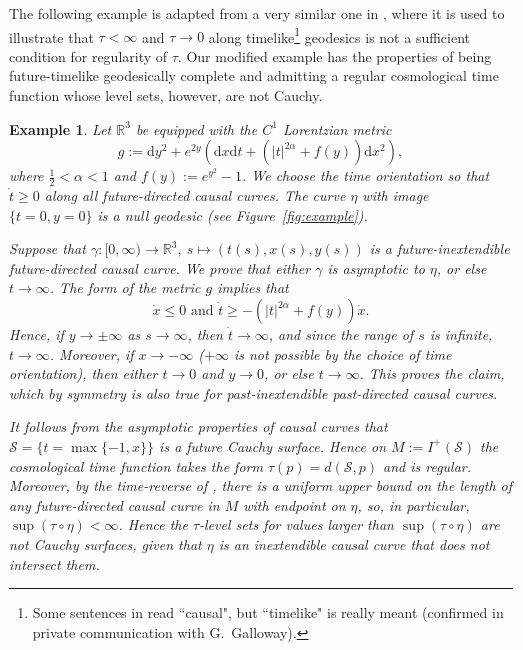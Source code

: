 \documentclass[a4paper,11pt]{amsart}
\newtheorem{example}[theorem]{{Example}}%
\newcommand{\R}{\mathbb{R}}
\newcommand{\CS}{\mathcal{S}}
\newcommand{\df}{\mathrm{d}}
\begin{document}
The following example is adapted from a very similar one in \cite[Sec.~4.3]{AGH98}, where it is used to illustrate that $\tau < \infty$ and $\tau \to 0$ along timelike\footnote{Some sentences in \cite{AGH98} read ``causal", but ``timelike" is really meant (confirmed in private communication with G.~Galloway).} geodesics is not a sufficient condition for regularity of $\tau$. Our modified example has the properties of being future-timelike geodesically complete and admitting a regular cosmological time function whose level sets, however, are not Cauchy.

\begin{example} \label{counterexCauchy}
 Let $\R^3$ be equipped with the $C^1$ Lorentzian metric
 \begin{equation*}
  g := \df y^2 + e^{2y} \left( \df x \df t + (\vert t \vert^{2\alpha} + f(y)) \df x^2 \right),
 \end{equation*}
 where $\frac{1}{2} < \alpha < 1$ and $f(y) := e^{y^2} - 1$. We choose the time orientation so that $\dot t \geq 0$ along all future-directed causal curves. The curve $\eta$ with image $\{t=0,y=0\}$ is a null geodesic (see Figure~\ref{fig:example}).
 
 Suppose that $\gamma \colon [0,\infty) \to \R^3,\ s \mapsto (t(s),x(s),y(s))$ is a future-inextendible future-directed causal curve. We prove that either $\gamma$ is asymptotic to $\eta$, or else $t \to \infty$. The form of the metric $g$ implies that
 \begin{equation*}
     \dot x \leq 0 \text{ and } \dot t \geq -(\vert t \vert^{2 \alpha} + f(y))\dot x.
 \end{equation*}
 Hence, if $y \to \pm \infty$ as $s \to \infty$, then $\dot t \to \infty$, and since the range of $s$ is infinite, $t \to \infty$. Moreover, if $x \to -\infty$ ($+\infty$ is not possible by the choice of time orientation), then either $t\to 0$ and $y\to 0$, or else $t \to \infty$. This proves the claim, which by symmetry is also true for past-inextendible past-directed causal curves.

 It follows from the asymptotic properties of causal curves that $\CS = \{ t = \max\{-1,x\}\}$ is a future Cauchy surface. Hence on $M := I^+(\CS)$ the cosmological time function takes the form $\tau(p) = d(\CS,p)$ and is regular. Moreover, by the time-reverse of \cite[Lem.~4.2]{AGH98}, there is a uniform upper bound on the length of any future-directed causal curve in $M$ with endpoint on $\eta$, so, in particular, $\sup (\tau \circ \eta) < \infty$. Hence the $\tau$-level sets for values larger than $\sup (\tau \circ \eta)$ are not Cauchy surfaces, given that $\eta$ is an inextendible causal curve that does not intersect them.


\end{example}
\end{document}
